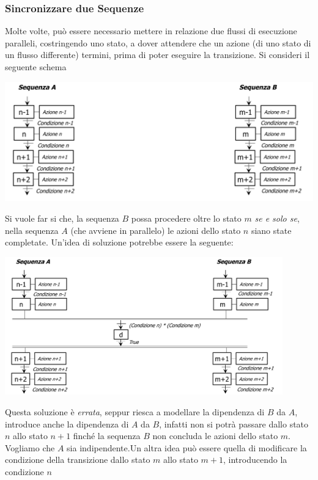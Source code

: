 \documentclass[10pt, letterpaper]{report}
\begin{document}
\subsubsection{Sincronizzare due Sequenze}
Molte volte, può essere necessario mettere in relazione due flussi di esecuzione paralleli, costringendo uno stato, a dover attendere che un azione (di uno stato di un flusso differente) termini, prima di poter eseguire la transizione. Si consideri il seguente schema
\begin{center}
    \includegraphics[width=1\textwidth ]{images/relazione.png}
\end{center}
Si vuole far si che, la sequenza $B$ possa procedere oltre lo stato $m$ \textit{se e solo se}, nella sequenza $A$ (che avviene in parallelo) le azioni dello stato $n$ siano state completate. Un'idea di soluzione potrebbe essere la seguente:
\begin{center}
    \includegraphics[width=0.9\textwidth ]{images/relazione2.png}
\end{center}
Questa soluzione è \textit{errata}, seppur riesca a modellare la dipendenza di $B$ da $A$, introduce anche la dipendenza di $A$ da $B$, infatti non si potrà passare dallo stato $n$ allo stato $n+1$ finché la sequenza $B$ non concluda le azioni dello stato $m$. Vogliamo che $A$ sia indipendente.\acc Un altra idea può essere quella di modificare la condizione della transizione dallo stato $m$ allo stato $m+1$, introducendo la condizione $n$
\end{document}
